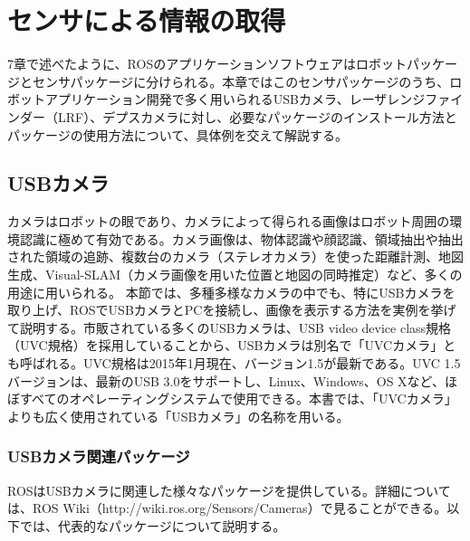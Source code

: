 
\chapter{センサによる情報の取得}

7章で述べたように、ROSのアプリケーションソフトウェアはロボットパッケージとセンサパッケージに分けられる。本章ではこのセンサパッケージのうち、ロボットアプリケーション開発で多く用いられるUSBカメラ、レーザレンジファインダー（LRF）、デプスカメラに対し、必要なパッケージのインストール方法とパッケージの使用方法について、具体例を交えて解説する。

\section{USBカメラ}

カメラはロボットの眼であり、カメラによって得られる画像はロボット周囲の環境認識に極めて有効である。カメラ画像は、物体認識や顔認識、領域抽出や抽出された領域の追跡、複数台のカメラ（ステレオカメラ）を使った距離計測、地図生成、Visual-SLAM（カメラ画像を用いた位置と地図の同時推定）など、多くの用途に用いられる。
本節では、多種多様なカメラの中でも、特にUSBカメラを取り上げ、ROSでUSBカメラとPCを接続し、画像を表示する方法を実例を挙げて説明する。市販されている多くのUSBカメラは、USB video device class規格（UVC規格）を採用していることから、USBカメラは別名で「UVCカメラ」とも呼ばれる。UVC規格は2015年1月現在、バージョン1.5が最新である。UVC 1.5バージョンは、最新のUSB 3.0をサポートし、Linux、Windows、OS Xなど、ほぼすべてのオペレーティングシステムで使用できる。本書では、「UVCカメラ」よりも広く使用されている「USBカメラ」の名称を用いる。

\subsection{USBカメラ関連パッケージ}

ROSはUSBカメラに関連した様々なパッケージを提供している。詳細については、ROS Wiki（http://wiki.ros.org/Sensors/Cameras）で見ることができる。以下では、代表的なパッケージについて説明する。

